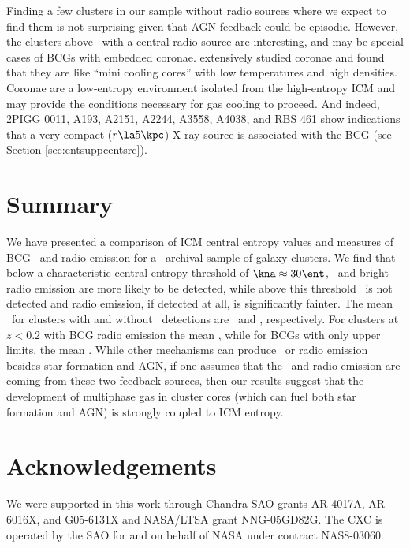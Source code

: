 Finding a few clusters in our sample without radio sources where we
expect to find them is not surprising given that AGN feedback could be
episodic. However, the clusters above \kthr\ with a central radio
source are interesting, and may be special cases of BCGs with embedded
coronae. \cite{coronae} extensively studied coronae and found that
they are like ``mini cooling cores'' with low temperatures and high
densities. Coronae are a low-entropy environment isolated from the
high-entropy ICM and may provide the conditions necessary for gas
cooling to proceed. And indeed, 2PIGG 0011, A193, A2151, A2244, A3558,
A4038, and RBS 461 show indications that a very compact ($r \la
5\kpc$) X-ray source is associated with the BCG (see Section
\ref{sec:entsuppcentsrc}).

\section{Summary}
\label{sec:haraddiss}

We have presented a comparison of ICM central entropy values and
measures of BCG \halpha\ and radio emission for a \chandra\ archival
sample of galaxy clusters. We find that below a characteristic central
entropy threshold of $\kna \approx 30 \ent$, \halpha\ and bright radio
emission are more likely to be detected, while above this threshold
\halpha\ is not detected and radio emission, if detected at all, is
significantly fainter. The mean \kna\ for clusters with and without
\halpha\ detections are \fha\ and \nfha, respectively. For clusters at
$z < 0.2$ with BCG radio emission the mean \frad, while for BCGs with
only upper limits, the mean \nfrad. While other mechanisms can produce
\halpha\ or radio emission besides star formation and AGN, if one
assumes that the \halpha\ and radio emission are coming from these two
feedback sources, then our results suggest that the development of
multiphase gas in cluster cores (which can fuel both star formation
and AGN) is strongly coupled to ICM entropy.

\section{Acknowledgements}

We were supported in this work through Chandra SAO grants AR-4017A,
AR-6016X, and G05-6131X and NASA/LTSA grant NNG-05GD82G. The CXC is
operated by the SAO for and on behalf of NASA under contract
NAS8-03060.
